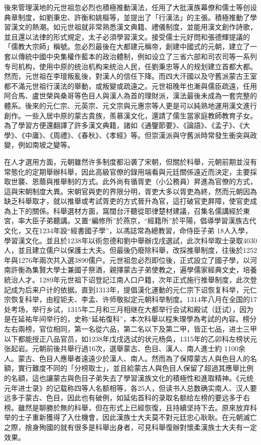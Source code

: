 後來管理漢地的元世祖忽必烈也積極推動漢法，任用了大批漢族幕僚和儒士等创设典章制度，如劉秉忠、許衡和姚樞等，並提出了「行漢法」的主張。積極推動了學習漢文的熱潮。如元世祖就非常熟悉漢文典籍、禮儀制度，並能用漢文創作詩歌，並且還以法律的形式規定，太子必須學習漢文。接受儒士元好問和張德輝提議的「儒教大宗師」稱號。忽必烈最後在大都建元稱帝，創建中國式的元朝，建立了一套以傳統中國中央集權作藍本的政治體制，例如设立了三省六部和司农司等一系列专司机构，使用中原的统治机构来统治人民，任劉秉忠等人的规划建立首都大都。然而，元世祖在李璮叛亂後，對漢人的信任下降。而四大汗國以及守舊派蒙古王室都不滿元世祖行漢法的舉動，或叛變或疏遠之。元世祖晚年也漸與儒臣疏遠，任用阿合馬、盧世榮與桑哥等色目人與漢人為首的理財派，漢法最後未成為一套完整的體系。後來的元仁宗、元英宗、元文宗與元惠宗等人更是可以純熟地運用漢文進行創作。一些入居中原的蒙古貴族，羨慕漢文化，還請了儒生當家庭教師教育子女。為了學習方便還翻譯了許多漢文典籍，諸如《通鑒節要》、《論語》、《孟子》、《大學》、《中庸》、《周禮》、《春秋》、《孝經》等。但崇漢派與守舊派時常發生衝突與政變，例如南坡之變等。

在人才選用方面，元朝雖然许多制度都沿袭了宋朝，但關於科舉，元朝前期並沒有常態化的定期舉辦科舉，因此高級官僚的錄用端看與元廷關係遠近而決定，主要採取世襲、恩蔭與推舉制的方式。此外尚有循胥吏（小公務員）昇進為官僚的方式，這與宋朝制度大異。宋朝官與吏的界限分明，胥吏大多以胥吏為終，然而元朝因為缺乏科舉取才，就以推舉或考試胥吏的方式晉升為官，這打破官吏屛障，使官吏成為上下的關係。科舉選材方面，窩闊台汗聽從耶律楚材建議，召集名儒講經於東宮，率大臣子弟聽講。又置“編修所”於燕京，“經籍所”於平陽，倡導學習漢族古代文化，又在1234年設“經書國子學”，以馮誌常為總教習，命侍臣子弟 18人入學，學習漢文化。並且於1238年以術忽德和劉中舉辦戊戌選試，此次科举取士录取4030人，並且建立儒户以保護士大夫。但最後仍廢除科舉，改採推舉制度，往後於1252年與1276年兩次共入選3890儒户。元世祖忽必烈即位後，正式設立了國子學，以河南許衡為集賢大學士兼國子祭酒，親擇蒙古子弟使教之，遍學儒家經典文史，培養統治人才。1289年元世祖下诏登記江南人口户籍，次年正式施行推舉制度，此次登記成为后来户计的依据。直到1313年，提倡漢化運動的元仁宗下诏恢复科举，元仁宗恢复科举，由程钜夫、李孟、许师敬拟定元朝科举制度。1314年八月在全国的17处考场，举行乡试，1315年二月和三月相继在大都举行会试和殿试（廷试），因为是在延祐年间举行的，史称“延祐復科”，本次科舉以程朱理學為考試的內容。榜分左右兩榜，官位相同，第一名從六品，第二名以下及第二甲，皆正七品，进士三甲以下都能授正八品官员，如1238年戊戌选试的状元杨奂，1315年的乙卯科左榜状元张起岩。元朝前後共舉行過16次，選舉蒙古、色目、漢人、南人進士約 1100余人。蒙古、色目人應舉者遠遠少於漢人、南人。然而為了保障蒙古人與色目人的名額，實行難度不同的「分榜取士」，並且給蒙古人與色目人保留了超過其應舉比例的名額，這也讓蒙古與色目子弟失去了學習漢族文化的積極性和進取精神。《元统元年进士录》的记载称四等人名额相等，各25人，但读书人总数确实南人、汉人要远多于蒙古、色目，因此也有破例，如延佑首科的录取名额给左榜的要远多于右榜。雖然是聊勝於無的科舉，但在形式上已經恢復，且持續坚持下去。原來放弃科举的士子重新獲得了入仕機會，因此漢族士大夫莫不對元廷忠心耿耿。在元朝滅亡之際，捨身殉國的就有很多是科舉出身者，可見科舉復辦對懷柔漢族士大夫有一定效果。

